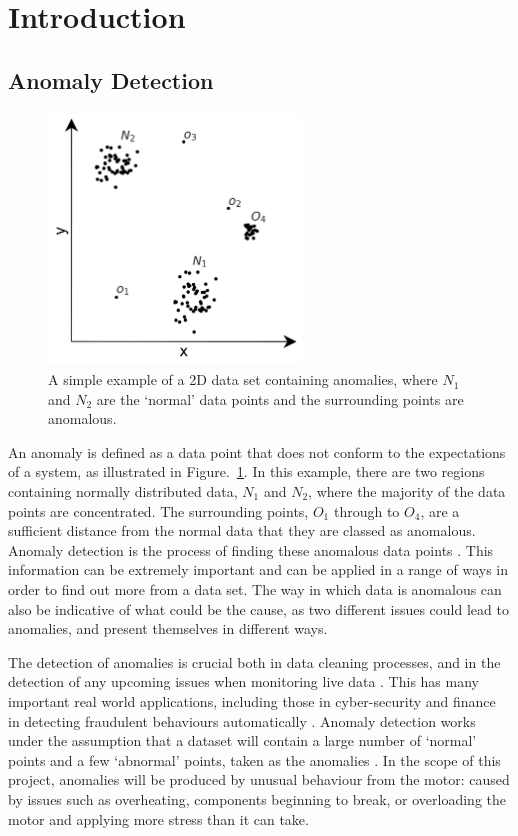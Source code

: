 \section{Introduction}
\label{sec:introduction}

\subsection{Anomaly Detection}
\label{subsec:anomaly_detection}

\begin{figure}[t]
    \centering
    \includegraphics[width=0.6\textwidth]{fig/anomalies.png}
    \caption[Example of Anomalies]{A simple example of a 2D data set containing anomalies, where $N_{1}$ and $N_{2}$ are the `normal' data points and the surrounding points are anomalous.}
    \label{fig:anomalies}
\end{figure}

An anomaly is defined as a data point that does not conform to the expectations of a system, as illustrated in Figure.~\ref{fig:anomalies}. In this example, there are two regions containing normally distributed data, $N_{1}$ and $N_{2}$, where the majority of the data points are concentrated. The surrounding points, $O_{1}$ through to $O_{4}$, are a sufficient distance from the normal data that they are classed as anomalous. Anomaly detection is the process of finding these anomalous data points \cite{huang}. This information can be extremely important and can be applied in a range of ways in order to find out more from a data set. The way in which data is anomalous can also be indicative of what could be the cause, as two different issues could lead to anomalies, and present themselves in different ways. 

The detection of anomalies is crucial both in data cleaning processes, and in the detection of any upcoming issues when monitoring live data \cite{Akouemo2016948}. This has many important real world applications, including those in cyber-security and finance in detecting fraudulent behaviours automatically \cite{618940}. Anomaly detection works under the assumption that a dataset will contain a large number of `normal' points and a few `abnormal' points, taken as the anomalies \cite{Pimentel2014215}. In the scope of this project, anomalies will be produced by unusual behaviour from the motor: caused by issues such as overheating, components beginning to break, or overloading the motor and applying more stress than it can take. 

